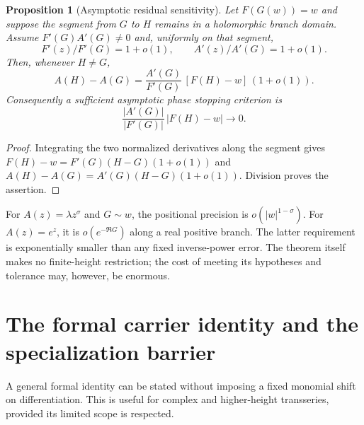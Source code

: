 \documentclass[11pt,a4paper]{article}
\newtheorem{proposition}[theorem]{Proposition}
\theoremstyle{definition}
\theoremstyle{remark}
\numberwithin{equation}{section}
\begin{document}
\begin{proposition}[Asymptotic residual sensitivity]\label{prop:residualsensitivity}
Let $F(G(w))=w$ and suppose the segment from $G$ to $H$ remains in a holomorphic branch domain. Assume $F'(G)A'(G)\ne0$ and, uniformly on that segment,
\[
 F'(z)/F'(G)=1+o(1),\qquad A'(z)/A'(G)=1+o(1).
\]
Then, whenever $H\ne G$,
\begin{equation}\label{eq:residualphase}
 A(H)-A(G)=\frac{A'(G)}{F'(G)}\,[F(H)-w]\,(1+o(1)).
\end{equation}
Consequently a sufficient asymptotic phase stopping criterion is
\[
 \frac{|A'(G)|}{|F'(G)|}\,|F(H)-w|\longrightarrow0.
\]
\end{proposition}
\begin{proof}
Integrating the two normalized derivatives along the segment gives
$F(H)-w=F'(G)(H-G)(1+o(1))$ and
$A(H)-A(G)=A'(G)(H-G)(1+o(1))$. Division proves the assertion.
\end{proof}

For $A(z)=\lambda z^\sigma$ and $G\sim w$, the positional precision is $o(|w|^{1-\sigma})$. For $A(z)=e^z$, it is $o(e^{-\Re G})$ along a real positive branch. The latter requirement is exponentially smaller than any fixed inverse-power error. The theorem itself makes no finite-height restriction; the cost of meeting its hypotheses and tolerance may, however, be enormous.

\section{The formal carrier identity and the specialization barrier}\label{sec:formal}

A general formal identity can be stated without imposing a fixed monomial shift on differentiation. This is useful for complex and higher-height transseries, provided its limited scope is respected.
\end{document}
